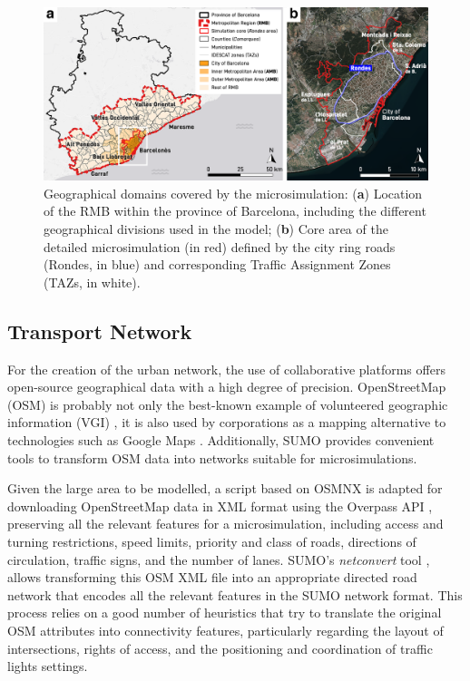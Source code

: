 \begin{figure}[htbp!]
    \centering
    \includegraphics[width=1\textwidth]{fig_02.png}
    \caption{Geographical domains covered by the microsimulation: (\textbf{a}) Location of the RMB within the province of Barcelona, including the different geographical divisions used in the model; (\textbf{b}) Core area of the detailed microsimulation (in red) defined by the city ring roads (Rondes, in blue) and corresponding Traffic Assignment Zones (TAZs, in white).}
   \label{fig:getting_real_02_geo_scope}
\end{figure}



\subsection{Transport Network}

For the creation of the urban network, the use of collaborative platforms offers open-source geographical data with a high degree of precision. OpenStreetMap (OSM) \citep{Haklay2008} is probably not only the best-known example of volunteered geographic information (VGI) \citep{Haklay2010}, it is also used by corporations as a mapping alternative to technologies such as Google Maps \citep{Anderson2019}. Additionally, SUMO provides convenient tools to transform OSM data into networks suitable for microsimulations.

Given the large area to be modelled, a script based on OSMNX \citep{Boeing2017} is adapted for downloading OpenStreetMap data \citep{OpenStreetMap} in XML format using the Overpass API \citep{wiki:xxx}, preserving all the relevant features for a microsimulation, including access and turning restrictions, speed limits, priority and class of roads, directions of circulation, traffic signs, and the number of lanes. SUMO’s \emph{netconvert} tool \citep{GermanAerospaceCenterDLRandothers2021d}, allows transforming this OSM XML file into an appropriate directed road network that encodes all the relevant features in the SUMO network format. This process relies on a good number of heuristics that try to translate the original OSM attributes into connectivity features, particularly regarding the layout of intersections, rights of access, and the positioning and coordination of traffic lights settings.

